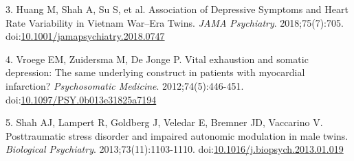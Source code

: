 \documentclass[10pt,]{tufte-handout}
\begin{document}
\leavevmode\hypertarget{ref-Huang2018}{}%
3. Huang M, Shah A, Su S, et al. Association of Depressive Symptoms and
Heart Rate Variability in Vietnam War--Era Twins. \emph{JAMA
Psychiatry}. 2018;75(7):705.
doi:\href{https://doi.org/10.1001/jamapsychiatry.2018.0747}{10.1001/jamapsychiatry.2018.0747}

\leavevmode\hypertarget{ref-Vroege2012}{}%
4. Vroege EM, Zuidersma M, De Jonge P. Vital exhaustion and somatic
depression: The same underlying construct in patients with myocardial
infarction? \emph{Psychosomatic Medicine}. 2012;74(5):446-451.
doi:\href{https://doi.org/10.1097/PSY.0b013e31825a7194}{10.1097/PSY.0b013e31825a7194}

\leavevmode\hypertarget{ref-Shah2013}{}%
5. Shah AJ, Lampert R, Goldberg J, Veledar E, Bremner JD, Vaccarino V.
Posttraumatic stress disorder and impaired autonomic modulation in male
twins. \emph{Biological Psychiatry}. 2013;73(11):1103-1110.
doi:\href{https://doi.org/10.1016/j.biopsych.2013.01.019}{10.1016/j.biopsych.2013.01.019}
\end{document}
